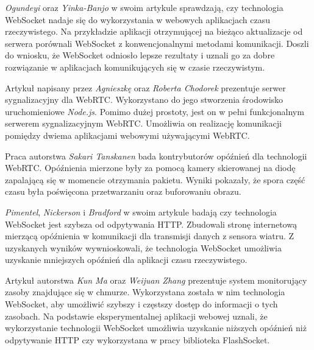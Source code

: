 \documentclass[language=polish,type=master]{aghmodern}
\begin{document}
\emph{Ogundeyi} oraz \emph{Yinka-Banjo} w swoim artykule \cite{websocket_realtime} sprawdzają, czy technologia WebSocket nadaje się do wykorzystania w webowych aplikacjach czasu rzeczywistego.
Na przykładzie aplikacji otrzymującej na bieżąco aktualizacje od serwera porównali WebSocket z konwencjonalnymi metodami komunikacji.
Doszli do wniosku, że WebSocket odniosło lepsze rezultaty i uznali go za dobre rozwiązanie w aplikacjach komunikujących się w czasie rzeczywistym.

Artykuł \cite{webrtc_signaling} napisany przez \emph{Agnieszkę} oraz \emph{Roberta Chodorek} prezentuje serwer sygnalizacyjny dla WebRTC.
Wykorzystano do jego stworzenia środowisko uruchomieniowe \emph{Node.js}.
Pomimo dużej prostoty, jest on w pełni funkcjonalnym serwerem sygnalizacyjnym WebRTC.
Umożliwia on realizację komunikacji pomiędzy dwiema aplikacjami webowymi używającymi WebRTC.

Praca \cite{webrtc_latency} autorstwa \emph{Sakari Tanskanen} bada kontrybutorów opóźnień dla technologii WebRTC.
Opóźnienia mierzone były za pomocą kamery skierowanej na diodę zapalającą się w momencie otrzymania pakietu.
Wyniki pokazały, że spora część czasu była poświęcona przetwarzaniu oraz buforowaniu obrazu.

\emph{Pimentel}, \emph{Nickerson} i \emph{Bradford} w swoim artykule \cite{websocket_sensor} badają czy technologia WebSocket jest szybsza od odpytywania HTTP.
Zbudowali stronę internetową mierzącą opóźnienia w komunikacji dla transmisji danych z sensora wiatru.
Z uzyskanych wyników wywnioskowali, że technologia WebSocket umożliwia uzyskanie mniejszych opóźnień dla aplikacji czasu rzeczywistego.

Artykuł \cite{websocket_monitoring} autorstwa \emph{Kun Ma} oraz \emph{Weijuan Zhang} prezentuje system monitorujący zasoby znajdujące się w chmurze.
Wykorzystana została w nim technologia WebSocket, aby umożliwić szybszy i częstszy dostęp do informacji o tych zasobach.
Na podstawie eksperymentalnej aplikacji webowej uznali, że wykorzystanie technologii WebSocket umożliwia uzyskanie niższych opóźnień niż odpytywanie HTTP czy wykorzystana w pracy biblioteka FlashSocket.
\end{document}
